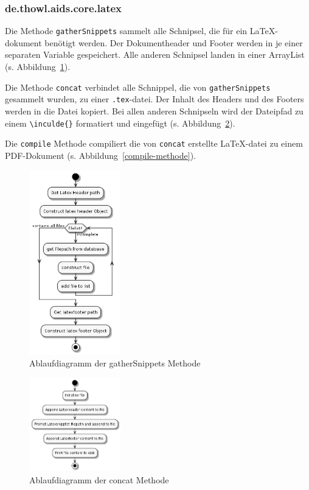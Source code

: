 \documentclass[stu, a4paper, 11pt, floatsintext]{apa7}
\begin{document}
\subsubsection{de.thowl.aids.core.latex}
\noindent Die Methode \texttt{gatherSnippets} sammelt alle Schnipsel, die für ein \LaTeX{}-dokument benötigt werden.
Der Dokumentheader und Footer werden in je einer separaten Variable gespeichert.
Alle anderen Schnipsel landen in einer ArrayList (s. Abbildung~\ref{gatherSnippets-methode}).

Die Methode \texttt{concat} verbindet alle Schnippel, die von \texttt{gatherSnippets} gesammelt wurden, zu einer \texttt{.tex}-datei.
Der Inhalt des Headers und des Footers werden in die Datei kopiert.
Bei allen anderen Schnipseln wird der Dateipfad zu einem \texttt{\textbackslash{}inculde\{\}} formatiert und eingefügt (s. Abbildung~\ref{concat-methode}).

Die \texttt{compile} Methode compiliert die von \texttt{concat} erstellte \LaTeX{}-datei zu einem PDF-Dokument (s. Abbildung~\ref{compile-methode}).

\begin{figure}[!htbp]
\centering
\includegraphics[width=150px]{../technical_documentation/diagramm/uml/flowcharts/core/latex/gatherSnippets.png}
\caption{\label{gatherSnippets-methode}Ablaufdiagramm der gatherSnippets Methode}
\end{figure}

\begin{figure}[!htbp]
\centering
\includegraphics[width=150px]{../technical_documentation/diagramm/uml/flowcharts/core/latex/concat.png}
\caption{\label{concat-methode}Ablaufdiagramm der concat Methode}
\end{figure}
\end{document}
